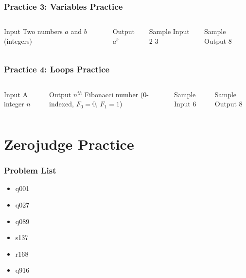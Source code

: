 \documentclass[xcolor=dvipsnames]{beamer}
\begin{document}
    \begin{frame}
        \frametitle{Practice 3: Variables Practice}
        \begin{columns}
            \begin{block}{Input}
            Two numbers $a$ and $b$ (integers)
            \end{block}
            \begin{block}{Output}
            $a^b$
            \end{block}
            \begin{block}{Sample Input}
            2 3
            \end{block}
            \begin{block}{Sample Output}
            8
            \end{block}
        \end{columns}
    \end{frame}
    \begin{frame}
        \frametitle{Practice 4: Loops Practice}
        \begin{columns}
            \begin{block}{Input}
            A integer $n$
            \end{block}
            \begin{block}{Output}
            $n^{th}$ Fibonacci number (0-indexed, $F_0=0$, $F_1=1$)
            \end{block}
            \begin{block}{Sample Input}
            6
            \end{block}
            \begin{block}{Sample Output}
            8
            \end{block}
        \end{columns}
    \end{frame}

    \section{Zerojudge Practice}
    \begin{frame}
        \frametitle{Problem List}
        \begin{itemize}
            \item q001
            \item q027
            \item q089
            \item s137
            \item r168
            \item q916
        \end{itemize}
    \end{frame}
\end{document}
